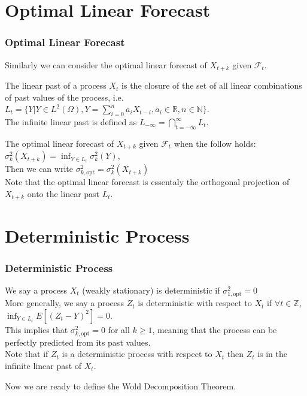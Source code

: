 \documentclass{beamer}
\newcommand{\R}{\mathbb{R}}
\newcommand{\Z}{\mathbb{Z}}
\begin{document}
\section{Optimal Linear Forecast}
\begin{frame}
    \frametitle{Optimal Linear Forecast}
    Similarly we can consider the optimal linear forecast of $X_{t+k}$ given $\mathcal{F}_t$.\\
    \begin{definition}
        The linear past of a process $X_t$ is the closure of the set of all linear combinations of past values of the process, i.e.
        $L_t = \{Y |Y \in L^2(\Omega), Y = \sum_{i=0}^{n} a_i X_{t-i}, a_i \in \R, n \in \mathbb{N}\}$.\\
        The infinite linear past is defined as $L_{-\infty} = \bigcap_{t=-\infty}^{\infty} L_t$.
    \end{definition}
    \begin{definition}
        The optimal linear forecast of $X_{t+k}$ given $\mathcal{F}_t$ when the follow holds: $\sigma^2_k(X_{t+k}) = \inf_{Y \in L_t} \sigma^2_k(Y)$,\\
        Then we can write $\sigma^2_{k,\text{opt}} = \sigma^2_k(X_{t+k})$\\
        Note that the optimal linear forecast is essentaly the orthogonal projection of $X_{t+k}$ onto the linear past $L_t$.
    \end{definition}
\end{frame}

\section{Deterministic Process}
\begin{frame}
    \frametitle{Deterministic Process}
        \begin{definition}[Deterministic]
            We say a process $X_t$ (weakly stationary) is deterministic if $\sigma^2_{1, \text{opt}} = 0$ \\
            More generally, we say a process $Z_t$ is deterministic with respect to $X_t$ if $\forall t \in \Z$, $\inf_{Y \in L_t} E[(Z_t - Y)^2] = 0$.\\
            This implies that $\sigma^2_{k, \text{opt}} = 0$ for all $k \geq 1$, meaning that the process can be perfectly predicted from its past values.\\
            Note that if $Z_t$ is a deterministic process with respect to $X_t$ then $Z_t$ is in the infinite linear past of $X_t$.
        \end{definition}
        Now we are ready to define the Wold Decomposition Theorem.
\end{frame}
\end{document}
